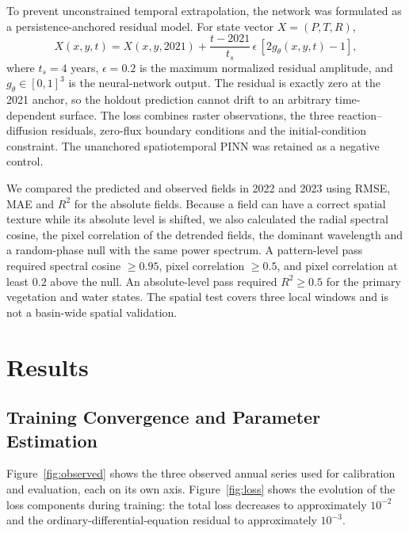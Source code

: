 \documentclass[preprint,review,12pt,3p]{elsarticle}
\begin{document}
To prevent unconstrained temporal extrapolation, the network was formulated as a persistence-anchored residual model. For state vector $X=(P,T,R)$,
\begin{equation}
	X(x,y,t)=X(x,y,2021)+\frac{t-2021}{t_s}\,\epsilon\,[2g_{\theta}(x,y,t)-1],
	\label{eq:spatial_pinn}
\end{equation}
where $t_s=4$ years, $\epsilon=0.2$ is the maximum normalized residual amplitude, and $g_{\theta}\in[0,1]^3$ is the neural-network output. The residual is exactly zero at the 2021 anchor, so the holdout prediction cannot drift to an arbitrary time-dependent surface. The loss combines raster observations, the three reaction--diffusion residuals, zero-flux boundary conditions and the initial-condition constraint. The unanchored spatiotemporal PINN was retained as a negative control.

We compared the predicted and observed fields in 2022 and 2023 using RMSE, MAE and $R^2$ for the absolute fields. Because a field can have a correct spatial texture while its absolute level is shifted, we also calculated the radial spectral cosine, the pixel correlation of the detrended fields, the dominant wavelength and a random-phase null with the same power spectrum. A pattern-level pass required spectral cosine $\ge0.95$, pixel correlation $\ge0.5$, and pixel correlation at least $0.2$ above the null. An absolute-level pass required $R^2\ge0.5$ for the primary vegetation and water states. The spatial test covers three local windows and is not a basin-wide spatial validation.
	
	\section{Results}
	
	\subsection{Training Convergence and Parameter Estimation}
	
	Figure~\ref{fig:observed} shows the three observed annual series used for calibration and evaluation, each on its own axis. Figure~\ref{fig:loss} shows the evolution of the loss components during training: the total loss decreases to approximately $10^{-2}$ and the ordinary-differential-equation residual to approximately $10^{-3}$.
\end{document}
